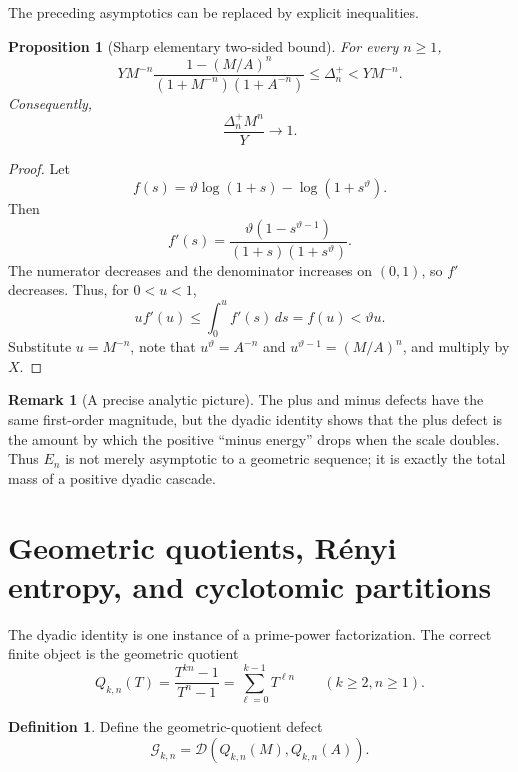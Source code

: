 \documentclass[11pt]{article}
\newtheorem{proposition}[theorem]{Proposition}
\theoremstyle{definition}
\newtheorem{definition}[theorem]{Definition}
\newtheorem{remark}[theorem]{Remark}
\newcommand{\vtheta}{\vartheta}
\newcommand{\Dlog}{\mathscr D}
\begin{document}
The preceding asymptotics can be replaced by explicit inequalities.

\begin{proposition}[Sharp elementary two-sided bound]\label{prop:two-sided-plus}
For every $n\ge1$,
\begin{equation}\label{eq:plus-bound}
 Y M^{-n}
 \frac{1-(M/A)^n}{(1+M^{-n})(1+A^{-n})}
 \le \Delta_n^+
 <Y M^{-n}.
\end{equation}
Consequently,
\begin{equation}\label{eq:normalized-plus}
 \frac{\Delta_n^+M^n}{Y}\longrightarrow1.
\end{equation}
\end{proposition}

\begin{proof}
Let
\[
 f(s)=\vtheta\log(1+s)-\log(1+s^{\vtheta}).
\]
Then
\begin{equation}\label{eq:fprime}
 f'(s)=\frac{\vtheta(1-s^{\vtheta-1})}{(1+s)(1+s^{\vtheta})}.
\end{equation}
The numerator decreases and the denominator increases on $(0,1)$, so $f'$ decreases.
Thus, for $0<u<1$,
\[
 u f'(u)\le \int_0^u f'(s)\,ds=f(u)<\vtheta u.
\]
Substitute $u=M^{-n}$, note that $u^{\vtheta}=A^{-n}$ and
$u^{\vtheta-1}=(M/A)^n$, and multiply by $X$.
\end{proof}

\begin{remark}[A precise analytic picture]
The plus and minus defects have the same first-order magnitude, but the dyadic identity
shows that the plus defect is the amount by which the positive ``minus energy'' drops
when the scale doubles.  Thus $E_n$ is not merely asymptotic to a geometric sequence; it
is exactly the total mass of a positive dyadic cascade.
\end{remark}

\section{Geometric quotients, R\'enyi entropy, and cyclotomic partitions}
\label{sec:cyclotomic}

The dyadic identity is one instance of a prime-power factorization.  The correct finite
object is the geometric quotient
\begin{equation}\label{eq:Qkn}
 Q_{k,n}(T)=\frac{T^{kn}-1}{T^n-1}
 =\sum_{\ell=0}^{k-1}T^{\ell n}
 \qquad(k\ge2,n\ge1).
\end{equation}

\begin{definition}
Define the geometric-quotient defect
\begin{equation}\label{eq:Gkn}
 \mathcal G_{k,n}=\Dlog(Q_{k,n}(M),Q_{k,n}(A)).
\end{equation}
\end{definition}
\end{document}
